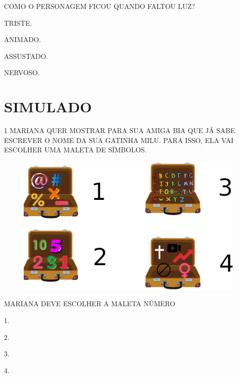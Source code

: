 COMO O PERSONAGEM FICOU QUANDO FALTOU LUZ?

\begin{escolha}[itemsep=-5pt]
\item TRISTE.

\item ANIMADO.

\item ASSUSTADO.

\item NERVOSO.
\end{escolha}

\chapter[SIMULADO 2]{SIMULADO}

\pagebreak

\num{1} MARIANA QUER MOSTRAR PARA SUA AMIGA BIA QUE JÁ SABE ESCREVER O NOME DA SUA GATINHA MILU. PARA ISSO, ELA VAI ESCOLHER UMA MALETA DE SÍMBOLOS. 

\begin{figure}[H]
\includegraphics[width=\textwidth]{media/image209.png}
\end{figure}

MARIANA DEVE ESCOLHER A MALETA NÚMERO

\begin{multicols}{4}
\begin{escolha}[itemsep=0pt]
\item 1.

\item 2.

\item 3.

\item 4.
\end{escolha}
\end{multicols}

